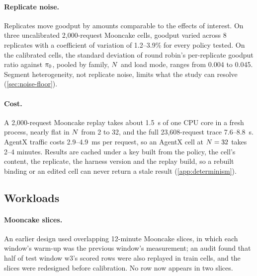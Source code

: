 \paragraph{Replicate noise.}
Replicates move goodput by amounts comparable to the effects of interest. On three uncalibrated
2,000-request Mooncake cells, goodput varied across 8 replicates with a coefficient of variation
of 1.2--3.9\% for every policy tested. On the calibrated cells, the standard deviation of
round robin's per-replicate goodput ratio against $\pi_{0}$, pooled by family, $N$ and load
mode, ranges from 0.004 to 0.045. Segment heterogeneity, not replicate noise, limits what the
study can resolve (\cref{sec:noise-floor}).

\paragraph{Cost.}
A 2,000-request Mooncake replay takes about \SI{1.5}{s} of one CPU core in a fresh process, nearly
flat in $N$ from 2 to 32, and the full 23,608-request trace 7.6--\SI{8.8}{s}. AgentX traffic
costs 2.9--\SI{4.9}{ms} per request, so an AgentX cell at $N = 32$ takes 2--4 minutes. Results
are cached under a key built from the policy, the cell's content, the replicate, the harness
version and the replay build, so a rebuilt binding or an edited cell can never return a stale
result (\cref{app:determinism}).

\subsection{Workloads}
\label{app:workloads}

\paragraph{Mooncake slices.}
An earlier design used overlapping 12-minute Mooncake slices, in which each window's warm-up was
the previous window's measurement; an audit found that half of test window w3's scored rows were
also replayed in train cells, and the slices were redesigned before calibration. No row now
appears in two slices.

